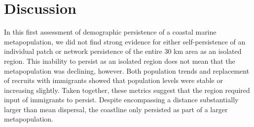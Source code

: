 \documentclass[12pt, oneside]{article}   	%
\begin{document}


\section*{Discussion}

In this first assessment of demographic persistence of a coastal marine metapopulation, we did not find strong evidence for either self-persistence of an individual patch or network persistence of the entire 30 km area as an isolated region. This inability to persist as an isolated region does not mean that the metapopulation was declining, however. Both population trends and replacement of recruits with immigrants showed that population levels were stable or increasing slightly. Taken together, these metrics suggest that the region required input of immigrants to persist. Despite encompassing a distance substantially larger than mean dispersal, the coastline only persisted as part of a larger metapopulation.
\end{document}
